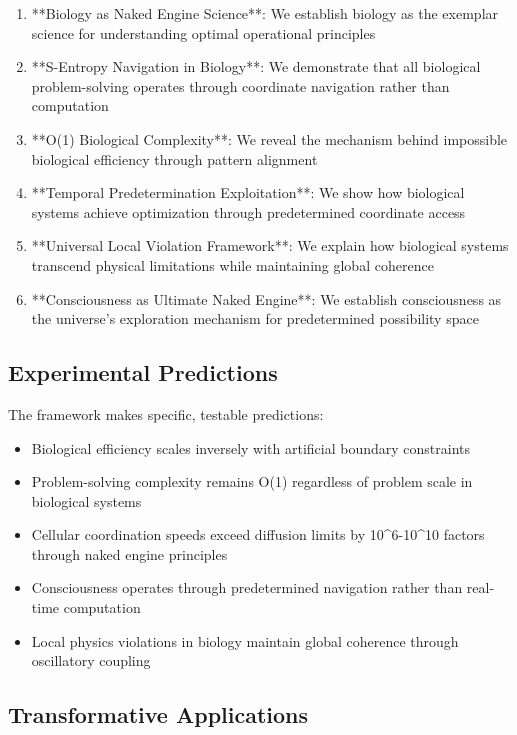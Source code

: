 \documentclass[12pt,a4paper]{article}
\begin{document}
\begin{enumerate}
\item **Biology as Naked Engine Science**: We establish biology as the exemplar science for understanding optimal operational principles
\item **S-Entropy Navigation in Biology**: We demonstrate that all biological problem-solving operates through coordinate navigation rather than computation
\item **O(1) Biological Complexity**: We reveal the mechanism behind impossible biological efficiency through pattern alignment
\item **Temporal Predetermination Exploitation**: We show how biological systems achieve optimization through predetermined coordinate access
\item **Universal Local Violation Framework**: We explain how biological systems transcend physical limitations while maintaining global coherence
\item **Consciousness as Ultimate Naked Engine**: We establish consciousness as the universe's exploration mechanism for predetermined possibility space
\end{enumerate}

\subsection{Experimental Predictions}

The framework makes specific, testable predictions:
\begin{itemize}
\item Biological efficiency scales inversely with artificial boundary constraints
\item Problem-solving complexity remains O(1) regardless of problem scale in biological systems
\item Cellular coordination speeds exceed diffusion limits by 10^6-10^10 factors through naked engine principles
\item Consciousness operates through predetermined navigation rather than real-time computation
\item Local physics violations in biology maintain global coherence through oscillatory coupling
\end{itemize}

\subsection{Transformative Applications}
\end{document}
